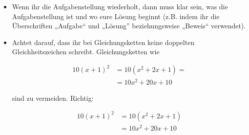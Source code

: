 \documentclass[a4paper]{article}
\begin{document}
\begin{itemize}
  \item Wenn ihr die Aufgabenstellung wiederholt, dann muss klar sein, was die Aufgabenstellung ist und wo eure Lösung beginnt (z.B. indem ihr die Überschriften „Aufgabe“ und „Lösung” beziehungsweise „Beweis“ verwendet).
  \item Achtet darauf, dass ihr bei Gleichungsketten keine doppelten Gleichheitszeichen schreibt. Gleichungsketten wie

    \begin{align}
      10(x+1)^2 & = 10(x^2+2x+1) = \\
      &= 10x^2+20x + 10
    \end{align}

    sind zu vermeiden. Richtig:

    \begin{align}
      10(x+1)^2 & = 10(x^2+2x+1) \\
      &= 10x^2+20x + 10
    \end{align}
\end{itemize}
\end{document}
